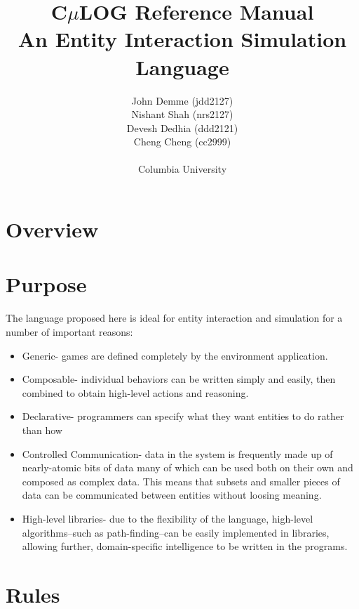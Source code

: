 \documentclass[onecolumn,titlepage]{article}
\begin{document}
\title{C$\mu$LOG Reference Manual\\\small{An Entity Interaction Simulation Language}}
\author{John Demme (jdd2127)\\Nishant Shah (nrs2127)\\Devesh Dedhia (ddd2121)\\Cheng Cheng (cc2999)
\\ \\Columbia University}

\maketitle

\section{Overview}

\section{Purpose}
The language proposed here is ideal for entity interaction and simulation for a 
number of important reasons:
\begin{itemize}
\item Generic- games are defined completely by the environment application.

\item Composable- individual behaviors can be written simply and easily, then combined
  to obtain high-level actions and reasoning.

\item Declarative- programmers can specify what they want entities to do rather than how

\item Controlled Communication- data in the system is frequently made up of nearly-atomic bits of data
  many of which can be used both on their own and composed as complex data.  This means that subsets
  and smaller pieces of data can be communicated between entities without loosing meaning.

\item High-level libraries- due to the flexibility of the language, high-level
  algorithms--such as path-finding--can be easily implemented in libraries, allowing
  further, domain-specific intelligence to be written in the programs.
\end{itemize}

\section{Rules}
\end{document}
